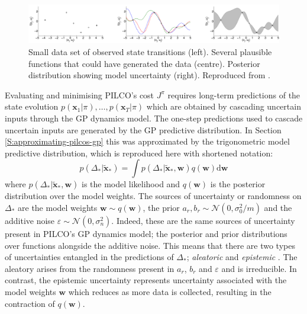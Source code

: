\begin{figure}
\centering    
\includegraphics[width=1.0\textwidth]{PILCO-model-bias.png}
\caption[Model-based bias in reinforcement learning]{Small data set of observed state transitions (left). Several plausible functions that could have generated the data (centre). Posterior distribution showing model uncertainty (right). Reproduced from \cite{deisenroth2011pilco}.}
\label{Fig:model-bias}
\end{figure}

Evaluating and minimising PILCO's cost $J^{\pi}$ requires long-term predictions of the state evolution $p\left(\mathbf{x}_{1} | \pi\right), \ldots,\allowbreak p\left(\mathbf{x}_{T} | \pi\right)$ which are obtained by cascading uncertain inputs through the GP dynamics model.  The one-step predictions used to cascade uncertain inputs are generated by the GP predictive distribution. In Section \ref{S:approximating-pilcos-gp} this was approximated by the trigonometric model predictive distribution, which is reproduced here with shortened notation:
\begin{equation}
    p(\Delta_{*} | \tilde{\mathbf{x}}_{*})=\int p(\Delta_{*} | \tilde{\mathbf{x}}_{*}, \mathbf{w}) q(\mathbf{w}) \mathrm{d} \mathbf{w}
    \label{Eq:Unc-predictive distribution}
\end{equation}
where $p(\Delta_{*} | \tilde{\mathbf{x}}_{*}, \mathbf{w})$ is the model likelihood and $q(\mathbf{w})$ is the posterior distribution over the model weights. The sources of uncertainty or randomness on $\Delta_{*}$ are the model weights $\mathbf{w}\sim q(\mathbf{w})$, the prior $a_{r}, b_{r} \sim \mathcal{N}\left(0,\sigma_{0}^{2}/m\right)$ and the additive noise $\varepsilon \sim \mathcal{N}\left(0,\sigma_{n}^{2} \right)$. Indeed, these are the same sources of uncertainty present in PILCO's GP dynamics model; the posterior and prior distributions over functions alongside the additive noise. This means that there are two types of uncertainties entangled in the predictions of $\Delta_{*}$; \textit{aleatoric} and \textit{epistemic} \cite{der2009aleatory}\cite{kendall2017uncertainties}. The aleatory arises from the randomness present in $a_{r}$, $b_{r}$ and $\varepsilon$ and is irreducible. In contrast, the epistemic uncertainty represents uncertainty associated with the model weights $\mathbf{w}$ which reduces as more data is collected, resulting in the contraction of $q(\mathbf{w})$.

